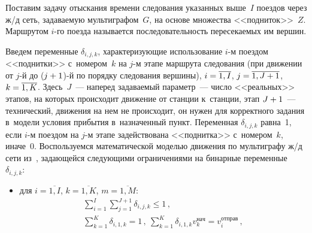 \begin{multicols}{2}
\vspace*{-4pt}

  Поставим задачу отыскания времени следования указанных выше~$I$ поездов 
через ж/д сеть, задаваемую мультиграфом~$G$, на основе множества 
<<подниток>>~$Z$. Маршрутом $i$-го поезда называется последовательность 
пересекаемых им вершин.
  
  Введем переменные $\delta_{i,j,k}$, характеризующие использование $i$-м 
поездом <<поднитки>> с~номером~$k$ на $j$-м этапе маршрута следования (при 
движении от $j$-й до ($j\hm+1$)-й по порядку следования вершины), $i\hm= 
\overline{1, I}$, $j\hm= \overline{1, J+1}$, $k\hm= \overline{1,K}$. Здесь~$J$~--- наперед 
задаваемый параметр~--- чис\-ло <<реальных>> этапов, на которых происходит 
движение от станции к~станции, этап $J\hm+1$~--- технический, движения на нем 
не происходит, он нужен для корректного задания в~модели условия прибытия 
в~назначенный пункт. Переменная $\delta_{i,j,k}$ равна~1, если $i$-м поездом на 
$j$-м этапе задействована <<под\-нит\-ка>> с~номером~$k$, иначе~0. Воспользуемся 
математической моделью движения по мультиграфу ж/д сети из~\cite{7-bos}, 
за\-да\-ющей\-ся сле\-ду\-ющи\-ми ограничениями на бинарные 
переменные~$\delta_{i,j,k}$:
\begin{itemize}
\item 
  для  $i=\overline{1,I}$, $k=\overline{1,K}$, $m=\overline{1,M}$:
    \begin{multline*}
 \sum\limits^I_{i=1} \sum\limits_{j=1}^{J+1} \delta_{i,j,k}\leq 1\,,\\
 \sum\limits_{k=1}^K \delta_{i,1,k}=1\,,\ \sum\limits^K_{k=1} \delta_{i,1,k} 
v_k^{\mathrm{нач}}=v_i^{\mathrm{отправ}}\,,
\end{multline*}


\end{itemize}
\end{multicols}
